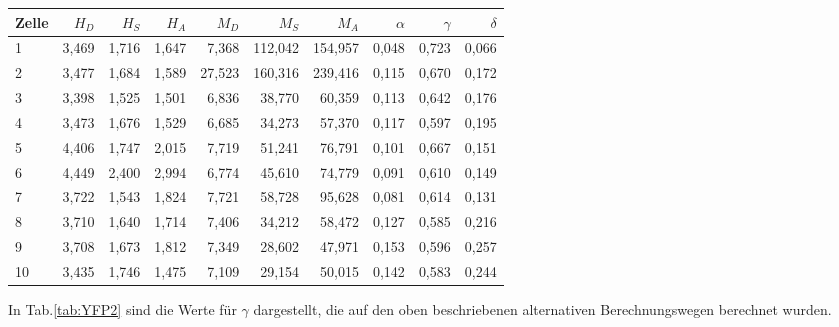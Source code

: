 \begin{center}
    
\centering
\begin{tabular}{lrrrrrrrrr}
    \toprule
    Zelle &  $H_D$ &  $H_S$ &  $H_A$ &   $M_D$ &    $M_S$ &    $M_A$ &  $\alpha$ &  $\gamma$ &  $\delta$ \\
    \midrule
    1     & 3,469 & 1,716 & 1,647 &  7,368 & 112,042 & 154,957 &  0,048 &  0,723 &  0,066 \\
    2     & 3,477 & 1,684 & 1,589 & 27,523 & 160,316 & 239,416 &  0,115 &  0,670 &  0,172 \\
    3     & 3,398 & 1,525 & 1,501 &  6,836 &  38,770 &  60,359 &  0,113 &  0,642 &  0,176 \\
    4     & 3,473 & 1,676 & 1,529 &  6,685 &  34,273 &  57,370 &  0,117 &  0,597 &  0,195 \\
    5     & 4,406 & 1,747 & 2,015 &  7,719 &  51,241 &  76,791 &  0,101 &  0,667 &  0,151 \\
    6     & 4,449 & 2,400 & 2,994 &  6,774 &  45,610 &  74,779 &  0,091 &  0,610 &  0,149 \\
    7     & 3,722 & 1,543 & 1,824 &  7,721 &  58,728 &  95,628 &  0,081 &  0,614 &  0,131 \\
    8     & 3,710 & 1,640 & 1,714 &  7,406 &  34,212 &  58,472 &  0,127 &  0,585 &  0,216 \\
    9     & 3,708 & 1,673 & 1,812 &  7,349 &  28,602 &  47,971 &  0,153 &  0,596 &  0,257 \\
    10    & 3,435 & 1,746 & 1,475 &  7,109 &  29,154 &  50,015 &  0,142 &  0,583 &  0,244 \\
    \bottomrule
\end{tabular}
\label{tab:YFP1}
\end{center}

In Tab.\ref{tab:YFP2} sind die Werte für $\gamma$ dargestellt, die auf den oben beschriebenen alternativen Berechnungswegen berechnet 
wurden.

